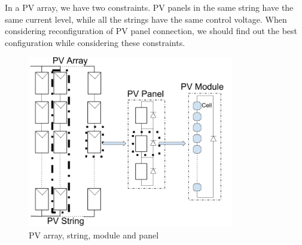 \documentclass[conference]{pvsctran}
\begin{document}
In a PV array, we have two constraints. 
PV panels in the same string have the same current level, while all the strings have the same control voltage. 
When considering reconfiguration of PV panel connection, we should find out the best configuration while considering these constraints. 

\begin{figure}[]
    \centering
    \includegraphics[width=9cm]{../fig/module.png}
    \caption{PV array, string, module and panel}
    \label{model}
\end{figure}
\end{document}
